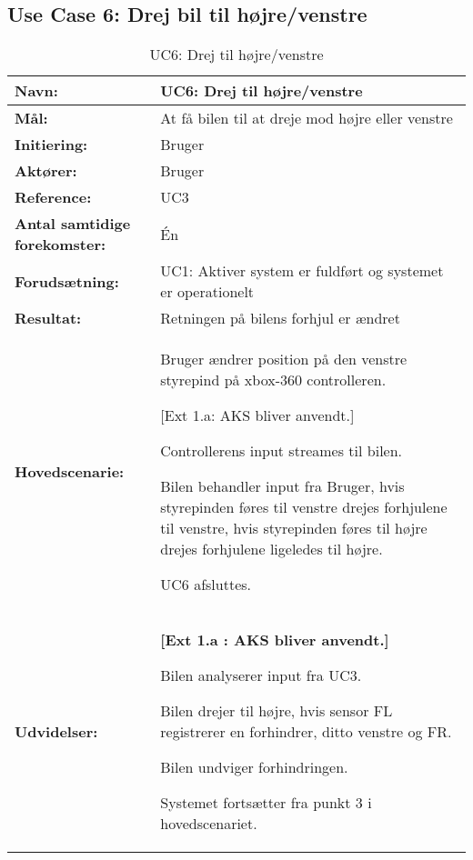 \subsection{Use Case 6: Drej bil til højre/venstre}
\begin{table}[h]
\begin{tabularx}{\textwidth}{| L{3.3 cm} | Z |} 													   \hline

\textbf{Navn:} 						& UC6: Drej til højre/venstre									\\ \hline
\textbf{Mål:}						& At få bilen til at dreje mod højre eller venstre				\\ \hline
\textbf{Initiering:}				& Bruger 														\\ \hline
\textbf{Aktører:} 					& Bruger	 													\\ \hline
\textbf{Reference:} 				& UC3 															\\ \hline
\textbf{Antal samtidige forekomster:} & Én 															\\ \hline
\textbf{Forudsætning:} 				& UC1: Aktiver system er fuldført og systemet er operationelt   \\ \hline
\textbf{Resultat:}					& Retningen på bilens forhjul er ændret 						\\ \hline
\textbf{Hovedscenarie:}				& 

\begin{packed_enum}
\item Bruger ændrer position på den venstre styrepind på xbox-360 controlleren.
	\begin{packed_item}\itemsep1pt \parskip0pt 
		\item {[}Ext 1.a: AKS bliver anvendt.{]}
	\end{packed_item}
	\item Controllerens input streames til bilen.
	\item Bilen behandler input fra Bruger, hvis styrepinden føres til venstre drejes forhjulene til venstre, hvis styrepinden føres til højre drejes forhjulene ligeledes til højre.
	\item UC6 afsluttes.
\end{packed_enum} \\ \hline
\textbf{Udvidelser:}				&  
\textbf{{[}Ext 1.a : AKS bliver anvendt.{]}}
	\begin{packed_enum}\itemsep1pt \parskip0pt 
		\item Bilen analyserer input fra UC3.
		\item Bilen drejer til højre, hvis sensor FL registrerer en forhindrer, ditto venstre og FR.
		\item Bilen undviger forhindringen. %
		\item Systemet fortsætter fra punkt 3 i hovedscenariet.
	\end{packed_enum}																				\\ \hline
\end{tabularx}
\caption{UC6: Drej til højre/venstre}
\label{tbl:UC6}
\end{table}